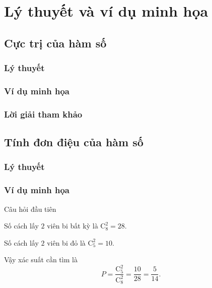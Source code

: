 \documentclass[14pt,a4paper]{extarticle}
\begin{document}

\mathcover




\newpage
\renewcommand{\contentsname}{\LARGE \bfseries MỤC LỤC}
\tableofcontents
\newpage


\pagelythuyetvidu


\section{Lý thuyết và ví dụ minh họa}
\subsection{Cực trị của hàm số}
\subsubsection{Lý thuyết}
\subsubsection{Ví dụ minh họa}
\subsubsection{Lời giải tham khảo}

\subsection{Tính đơn điệu của hàm số}
\subsubsection{Lý thuyết}
\subsubsection{Ví dụ minh họa}

\cau Câu hỏi đầu tiên 

\begin{loigiaividu}
Số cách lấy \(2\) viên bi bất kỳ là \(\mathrm{C}_8^2 = 28\).

Số cách lấy \(2\) viên bi đỏ là \(\mathrm{C}_5^2 = 10\).

Vậy xác suất cần tìm là
\[
P=\dfrac{\mathrm{C}_5^2}{\mathrm{C}_8^2}=\dfrac{10}{28}=\dfrac{5}{14}.
\]
\end{loigiaividu}
\end{document}
